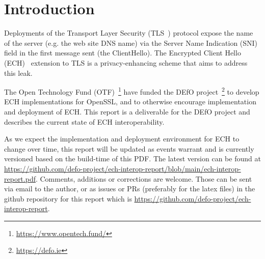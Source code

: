 \section{Introduction}

Deployments of the Transport Layer Security (TLS~\cite{rfc8446}) protocol
expose the name of the server (e.g. the web site DNS name) via the Server Name
Indication (SNI) field in the first message sent (the ClientHello).  The
Encrypted Client Hello (ECH)~\cite{draft-ietf-tls-esni} extension to TLS is a
privacy-enhancing scheme that aims to address this leak.

The Open Technology Fund (OTF)~\footnote{\url{https://www.opentech.fund/}} have
funded the DEfO project~\footnote{\url{https://defo.ie}} to develop 
ECH implementations for OpenSSL, and to otherwise encourage implementation
and deployment of ECH.  This report is a deliverable for the DEfO project
and describes the current state of ECH interoperability.

As we expect the implementation and deployment environment for ECH to change
over time, this report will be updated as events warrant and is currently
versioned based on the build-time of this PDF. The latest version can be found
at
\url{https://github.com/defo-project/ech-interop-report/blob/main/ech-interop-report.pdf}.
Comments, additions or corrections are welcome. Those can be sent via email to
the author, or as issues or PRs (preferably for the latex files) in the github
repository for this report which is
\url{https://github.com/defo-project/ech-interop-report}.
